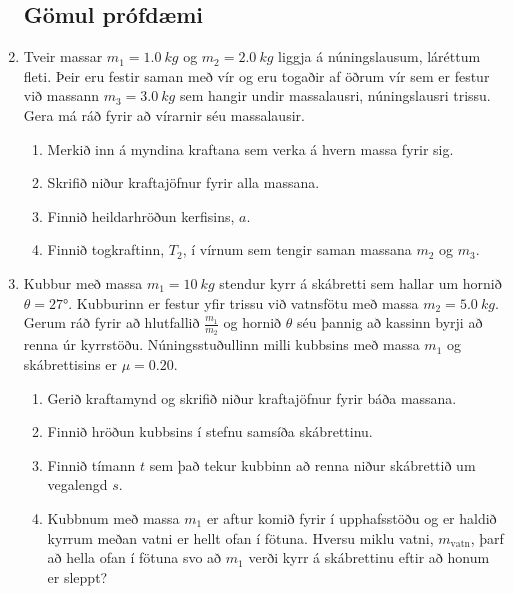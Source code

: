 \ifdefined \wholebook \else\documentclass[oneside]{book}\usepackage{EdlBook}\graphicspath{{figures/}}
\begin{document}
\begin{enumerate}[label = \textbf{Dæmi \thechapter.\arabic*.}]
\newpage

\subsection*{Gömul prófdæmi}


\item Tveir massar $m_1 = \SI{1.0}{kg}$ og $m_2 = \SI{2.0}{kg}$ liggja á núningslausum, láréttum fleti. Þeir eru festir saman með vír og eru togaðir af öðrum vír sem er festur við massann $m_3 = \SI{3.0}{kg}$ sem hangir undir massalausri, núningslausri trissu. Gera má ráð fyrir að vírarnir séu massalausir.
\begin{enumerate}[label = \textbf{(\alph*)}]
    \item Merkið inn á myndina kraftana sem verka á hvern massa fyrir sig.
    \item Skrifið niður kraftajöfnur fyrir alla massana.
    \item Finnið heildarhröðun kerfisins, $a$.
    \item Finnið togkraftinn, $T_2$, í vírnum sem tengir saman massana $m_2$ og $m_3$.
\end{enumerate}

\begin{center}

\end{center}

\item Kubbur með massa $m_1 = \SI{10}{kg}$ stendur kyrr á skábretti sem hallar um hornið $\theta = \ang{27}$. Kubburinn er festur yfir trissu við vatnsfötu með massa $m_2 = \SI{5.0}{kg}$. Gerum ráð fyrir að hlutfallið $\frac{m_1}{m_2}$ og hornið $\theta$ séu þannig að kassinn byrji að renna úr kyrrstöðu. Núningsstuðullinn milli kubbsins með massa $m_1$ og skábrettisins er $\mu = 0.20$.
\begin{enumerate}[label = \textbf{(\alph*)}]
    \item Gerið kraftamynd og skrifið niður kraftajöfnur fyrir báða massana.
    
    \item Finnið hröðun kubbsins í stefnu samsíða skábrettinu.
    \item  Finnið tímann $t$ sem það tekur kubbinn að renna niður skábrettið um vegalengd $s$.
    \item Kubbnum með massa $m_1$ er aftur komið fyrir í upphafsstöðu og er haldið kyrrum meðan vatni er hellt ofan í fötuna. Hversu miklu vatni, $m_{\text{vatn}}$, þarf að hella ofan í fötuna svo að $m_1$ verði kyrr á skábrettinu eftir að honum er sleppt?
\end{enumerate}


\end{enumerate}
\end{document}
